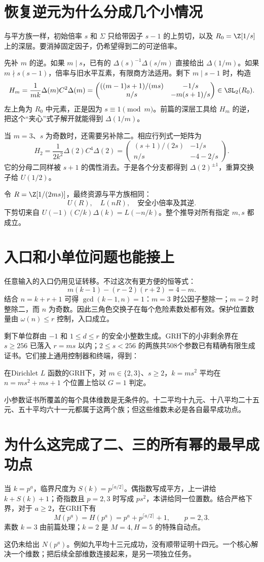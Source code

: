 \section{恢复逆元为什么分成几个小情况}
与平方族一样，初始倍率 $s$ 和 $\Sigma$ 只给带因子 $s-1$ 的上剪切，以及 $R_0=\Z[1/s]$ 上的深层。要消掉固定因子，仍希望得到二的可逆倍率。

先补 $m$ 的逆。如果 $m\mid s$，已有的 $\Delta(s)^{-1}\Delta(s/m)$ 直接给出 $\Delta(1/m)$。如果 $m\nmid s(s-1)$，倍率与旧水平互素，有限商方法适用。剩下 $m\mid s-1$ 时，构造
\[
H_m=\frac1{mk}\Delta(m)C^2\Delta(m)
=\begin{pmatrix}
((m-1)s+1)/(ms)&-1/s\\
n/s&-m(s+1)/s
\end{pmatrix}\in\SL_2(R_0).
\]
左上角为 $R_0$ 中元素，正是因为 $s\equiv1\pmod m$。前篇的深层工具给 $H_m$ 的逆，把这个“夹心”式子解开就能得到 $\Delta(1/m)$。

当 $m=3$、$s$ 为奇数时，还需要另补除二。相应行列式一矩阵为
\[
H_2=\frac1{2k^2}\Delta(2)C^4\Delta(2)
=\begin{pmatrix}
(s+1)/(2s)&-1/s\\n/s&-4-2/s
\end{pmatrix}.
\]
它的分母二同样被 $s+1$ 的偶性消去。于是各个分支都得到 $\Delta(2)^{\pm1}$，重算交换子给 $U(1/2)$。

令 $R=\Z[1/(2ms)]$，最终资源与平方族相同：
\[U(R),\quad L(nR),\quad\text{安全小倍率及其逆}.
\]
下剪切来自 $U(-1)(C/k)\Delta(k)=L(-n/k)$。整个推导对所有指定 $m,s$ 都成立。

\section{入口和小单位问题也能接上}
任意输入的入口仍用见证转移。不过这次有更方便的恒等式：
\[m(k-1)-(r-2)(r+2)=4-m.
\]
结合 $n=k+r+1$ 可得 $\gcd(k-1,n)=1$：$m=3$ 时公因子整除一；$m=2$ 时整除二，而 $n$ 为奇数。因此三角色交换子在每个危险素数处都有效。保护位置数量由 $\omega(n)\le r$ 控制，入口成立。

剩下单位群由 $-1$ 和 $1\le d\le r$ 的安全小整数生成。GRH下的小非剩余界在 $s\ge256$ 已落入 $r=ms$ 以内；$2\le s<256$ 的两族共508个参数已有精确有限生成证书。它们接上通用控制器和终端，得到：
\begin{theorem}[二、三平方倍数族]
在Dirichlet $L$ 函数的GRH下，对 $m\in\{2,3\}$、$s\ge2$，$k=ms^2$ 平均在 $n=ms^2+ms+1$ 个位置上恰以 $G=1$ 判定。
\end{theorem}
小参数证书所覆盖的每个具体维数是无条件的。十二平均十九元、十八平均二十五元、五十平均六十一元都属于这两个族；但这些维数未必是各自最早成功点。

\section{为什么这完成了二、三的所有幂的最早成功点}
当 $k=p^a$，临界尺度为 $S(k)=p^{\lceil a/2\rceil}$。偶指数写成平方，上一讲给 $k+S(k)+1$；奇指数且 $p=2,3$ 时写成 $ps^2$，本讲给同一位置数。结合严格下界，对于 $a\ge2$，在GRH下有
\[M(p^a)=H(p^a)=p^a+p^{\lceil a/2\rceil}+1,
\qquad p=2,3.
\]
素数 $k=3$ 由前篇处理；$k=2$ 是 $M=4,H=5$ 的特殊自动点。

这仍未给出 $N(p^a)$。例如九平均十三元成功，没有顺带证明十四元。一个核心解决一个维数；把后续全部维数连接起来，是另一项独立任务。
